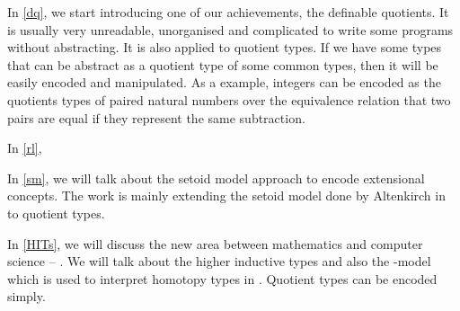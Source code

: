 In \autoref{dq}, we start introducing one of our achievements, the
definable quotients. It is usually very unreadable, unorganised and
complicated to write some programs without abstracting. It is also
applied to quotient types. If we have some types that can be abstract
as a quotient type of some common types, then it will be easily
encoded and manipulated. As a example, integers can be encoded as the
quotients types of paired natural numbers over the equivalence
relation that two pairs are equal if they represent the same
subtraction.

In \autoref{rl},


In \autoref{sm}, we will talk about the setoid model approach to encode
extensional concepts. The work is mainly extending the setoid model
done by Altenkirch in \cite{alti:lics99} to
quotient types.


In \autoref{HITs}, we will discuss the new area between mathematics and
computer science -- \hott. We will talk about the higher inductive
types and also the \wog-model which is used to interpret
homotopy types in \itt. Quotient types can be encoded \hott simply.